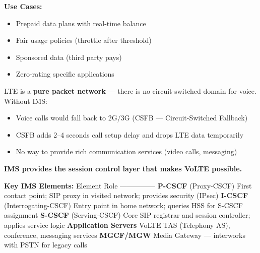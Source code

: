 \textbf{Use Cases:}

\begin{itemize}
\tightlist
\item
  Prepaid data plans with real-time balance
\item
  Fair usage policies (throttle after threshold)
\item
  Sponsored data (third party pays)
\item
  Zero-rating specific applications
\end{itemize}



\CNchained{}

LTE is a \textbf{pure packet network} — there is no circuit-switched domain for voice. Without IMS:

\begin{itemize}
\tightlist
\item
  Voice calls would fall back to 2G/\allowbreak{}3G (CSFB — Circuit-Switched Fallback)
\item
  CSFB adds 2–4 seconds call setup delay and drops LTE data temporarily
\item
  No way to provide rich communication services (video calls, messaging)
\end{itemize}

\textbf{IMS provides the session control layer that makes VoLTE possible.}




\textbf{Key IMS Elements:}\CNbr{}\textbar{} Element \textbar{} Role \textbar{}\CNbr{}\textbar{}———\textbar{}——\textbar{}\CNbr{}\textbar{} \textbf{P-CSCF} (Proxy-CSCF) \textbar{} First contact point; SIP proxy in visited network; provides security (IPsec) \textbar{}\CNbr{}\textbar{} \textbf{I-CSCF} (Interrogating-CSCF) \textbar{} Entry point in home network; queries HSS for S-CSCF assignment \textbar{}\CNbr{}\textbar{} \textbf{S-CSCF} (Serving-CSCF) \textbar{} Core SIP registrar and session controller; applies service logic \textbar{}\CNbr{}\textbar{} \textbf{Application Servers} \textbar{} VoLTE TAS (Telephony AS), conference, messaging services \textbar{}\CNbr{}\textbar{} \textbf{MGCF/\allowbreak{}MGW} \textbar{} Media Gateway — interworks with PSTN for legacy calls \textbar{}

